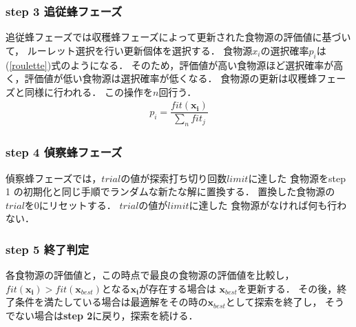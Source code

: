 \subsubsection*{step 3 追従蜂フェーズ}
追従蜂フェーズでは収穫蜂フェーズによって更新された食物源の評価値に基づいて，
ルーレット選択を行い更新個体を選択する．
食物源$x_i$の選択確率$p_i$は(\ref{roulette})式のようになる．
そのため，評価値が高い食物源ほど選択確率が高く，評価値が低い食物源は選択確率が低くなる．
食物源の更新は収穫蜂フェーズと同様に行われる．
この操作を$n$回行う．
\begin{align}
    p_i = \dfrac{fit(\boldsymbol{x_{i}})}{\sum_{n}fit_j}\label{roulette}
\end{align}
\subsubsection*{step 4 偵察蜂フェーズ}
偵察蜂フェーズでは，$trial$の値が探索打ち切り回数$limit$に達した
食物源をstep 1 の初期化と同じ手順でランダムな新たな解に置換する． 
置換した食物源の$trial$を0にリセットする．
$trial$の値が$limit$に達した
食物源がなければ何も行わない．
\subsubsection*{step 5 終了判定}
各食物源の評価値と，この時点で最良の食物源の評価値を比較し，
$fit(\boldsymbol{x_{i}}) > fit(\boldsymbol{x}_{best})$となる$\boldsymbol{x_{i}}$が存在する場合は
$\boldsymbol{x}_{best}$を更新する．
その後，終了条件を満たしている場合は最適解をその時の$\boldsymbol{x}_{best}$として探索を終了し，
そうでない場合は\textbf{step 2}に戻り，探索を続ける．